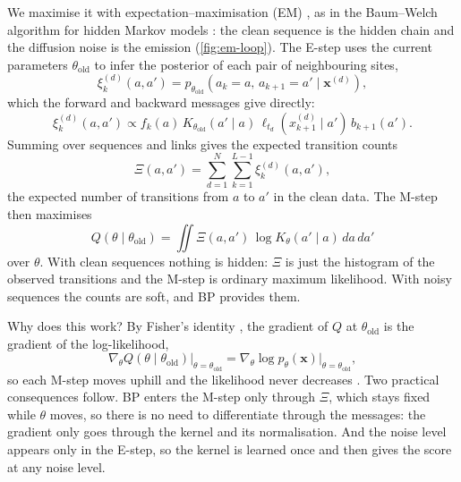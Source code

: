 We maximise it with expectation--maximisation (EM) \cite{dempster1977maximum}, as in the Baum--Welch algorithm for
hidden Markov models \cite{baum1970,rabiner1989tutorial}: the clean sequence is the hidden chain and the diffusion noise
is the emission (\cref{fig:em-loop}). The E-step uses the current parameters $\theta_{\mathrm{old}}$ to infer the
posterior of each pair of neighbouring sites,
\begin{equation}
    \xi_k^{(d)}(a,a')
    =
    p_{\theta_{\mathrm{old}}}
    \left(
        a_k=a,\,
        a_{k+1}=a'
        \mid \mathbf{x}^{(d)}
    \right),
\end{equation}
which the forward and backward messages give directly:
\begin{equation}
    \xi_k^{(d)}(a,a')
    \propto
    f_k(a)\,
    K_{\theta_{\mathrm{old}}}(a'\mid a)\,
    \ell_{t_d}(x_{k+1}^{(d)}\mid a')\,
    b_{k+1}(a').
    \label{eq:pairwise-posterior}
\end{equation}
Summing over sequences and links gives the expected transition counts
\begin{equation}
    \Xi(a,a')
    =
    \sum_{d=1}^{N}
    \sum_{k=1}^{L-1}
    \xi_k^{(d)}(a,a'),
\end{equation}
the expected number of transitions from $a$ to $a'$ in the clean data. The M-step then maximises
\begin{equation}
    Q(\theta\mid\theta_{\mathrm{old}})
    =
    \iint
    \Xi(a,a')\,
    \log K_\theta(a'\mid a)
    \,da\,da'
    \label{eq:em-objective}
\end{equation}
over $\theta$. With clean sequences nothing is hidden: $\Xi$ is just the histogram of the observed transitions and the
M-step is ordinary maximum likelihood. With noisy sequences the counts are soft, and BP provides them.

Why does this work? By Fisher's identity \cite{louis1982,cappe2005}, the gradient of $Q$ at $\theta_{\mathrm{old}}$ is
the gradient of the log-likelihood,
\begin{equation}
    \left.
    \nabla_\theta Q(\theta\mid\theta_{\mathrm{old}})
    \right|_{\theta=\theta_{\mathrm{old}}}
    =
    \nabla_\theta
    \log p_\theta(\mathbf{x})
    \big|_{\theta=\theta_{\mathrm{old}}},
\end{equation}
so each M-step moves uphill and the likelihood never decreases \cite{dempster1977maximum,wu1983}. Two practical
consequences follow. BP enters the M-step only through $\Xi$, which stays fixed while $\theta$ moves, so there is no
need to differentiate through the messages: the gradient only goes through the kernel and its normalisation. And the
noise level appears only in the E-step, so the kernel is learned once and then gives the score at any noise level.


